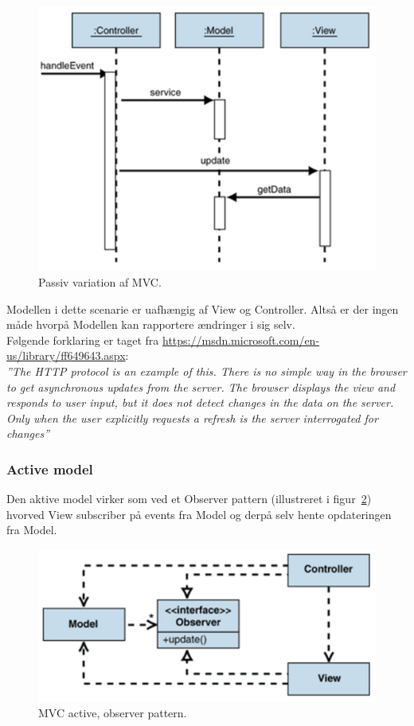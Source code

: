 \begin{figure}[H]
	\centering
	\includegraphics[width=0.6\linewidth]{figs/MVC/mvc_passive}
	\caption{Passiv variation af MVC.}
	\label{fig:mvc_passive}
\end{figure}

Modellen i dette scenarie er uafhængig af View og Controller. Altså er der ingen måde hvorpå Modellen kan rapportere ændringer i sig selv.\\

Følgende forklaring er taget fra \url{https://msdn.microsoft.com/en-us/library/ff649643.aspx}:\\

\textit{''The HTTP protocol is an example of this. There is no simple way in the browser to get asynchronous updates from the server. The browser displays the view and responds to user input, but it does not detect changes in the data on the server. Only when the user explicitly requests a refresh is the server interrogated for changes''}

\subsubsection{Active model}
Den aktive model virker som ved et Observer pattern (illustreret i figur~\ref{fig:mvc_observer}) hvorved View subscriber på events fra Model og derpå selv hente opdateringen fra Model.

\begin{figure}[h]
	\centering
	\includegraphics[width=0.7\linewidth]{figs/MVC/mvc_observer}
	\caption{MVC active, observer pattern.}
	\label{fig:mvc_observer}
\end{figure}

